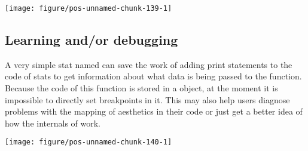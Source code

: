 \documentclass[paper=a4,10pt,div=17,headsepline,BCOR=12mm,twoside,open=right]{scrbook}\usepackage{knitr}
\begin{document}
\begin{knitrout}\footnotesize
{}\color{fgcolor}\begin{kframe}
\begin{alltt}
 \hlkwb{<-}  \hlopt{~}  \hlstd{,}  \hlstd{=} \hlstd{)}
    \hlopt{+}
  \hlstd{()} \hlopt{+}
  \hlstd{(} \hlstd{=} \hlstd{,}   \hlopt{+}
  \hlstd{(}\hlstd{(}   \hlstd{=} \hlstd{(}\hlopt{-}\hlstd{,} \hlstd{),}
                  \hlstd{=} \hlstd{)} \hlopt{+}
  \hlstd{()} \hlopt{+}
  \hlstd{(} \hlstd{=} \hlstd{)}
\end{alltt}
\end{kframe}

{\centering \texttt{[image: figure/pos-unnamed-chunk-139-1]} 

}



\end{knitrout}

\subsection{Learning and/or debugging}

A very simple stat named  can save the work of adding print statements to the code of stats to get information about what data is being passed to the  function. Because the code of this function is stored in a  object, at the moment it is impossible to directly set breakpoints in it. This  may also help users diagnose problems with the mapping of aesthetics in their code or just get a better idea of how the internals of \ggplot work.

\begin{knitrout}\footnotesize
{}\color{fgcolor}\begin{kframe}
\begin{alltt}
  \hlopt{+} \hlstd{()} \hlopt{+}
  \hlstd{(} \hlstd{=} \hlstd{)}
\end{alltt}
\end{kframe}

{\centering \texttt{[image: figure/pos-unnamed-chunk-140-1]} 

}



\end{knitrout}
\end{document}
